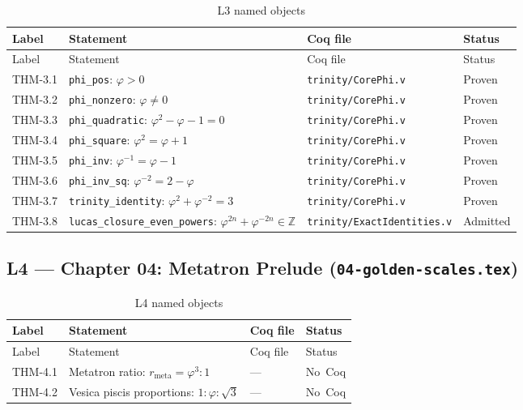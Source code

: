 \begin{longtable}{lp{6cm}ll}
\toprule
Label & Statement & Coq file & Status \\
\midrule
\endfirsthead
\toprule
Label & Statement & Coq file & Status \\
\midrule
\endhead
\bottomrule
\endfoot
\bottomrule
\caption{L3 named objects}
\endlastfoot
THM-3.1 & \texttt{phi\_pos}: $\varphi > 0$ &
  \texttt{trinity/CorePhi.v} & Proven \\
THM-3.2 & \texttt{phi\_nonzero}: $\varphi \neq 0$ &
  \texttt{trinity/CorePhi.v} & Proven \\
THM-3.3 & \texttt{phi\_quadratic}: $\varphi^{2}-\varphi-1=0$ &
  \texttt{trinity/CorePhi.v} & Proven \\
THM-3.4 & \texttt{phi\_square}: $\varphi^{2}=\varphi+1$ &
  \texttt{trinity/CorePhi.v} & Proven \\
THM-3.5 & \texttt{phi\_inv}: $\varphi^{-1}=\varphi-1$ &
  \texttt{trinity/CorePhi.v} & Proven \\
THM-3.6 & \texttt{phi\_inv\_sq}: $\varphi^{-2}=2-\varphi$ &
  \texttt{trinity/CorePhi.v} & Proven \\
THM-3.7 & \texttt{trinity\_identity}: $\varphi^{2}+\varphi^{-2}=3$ &
  \texttt{trinity/CorePhi.v} & Proven \\
THM-3.8 & \texttt{lucas\_closure\_even\_powers}:
  $\varphi^{2n}+\varphi^{-2n}\in\mathbb{Z}$ &
  \texttt{trinity/ExactIdentities.v} & Admitted \\
\end{longtable}

\subsection{L4 — Chapter 04: Metatron Prelude (\texttt{04-golden-scales.tex})}
\label{sec:A-L4}

\begin{longtable}{lp{6cm}ll}
\toprule
Label & Statement & Coq file & Status \\
\midrule
\endfirsthead
\toprule
Label & Statement & Coq file & Status \\
\midrule
\endhead
\bottomrule
\endfoot
\bottomrule
\caption{L4 named objects}
\endlastfoot
THM-4.1 & Metatron ratio: $r_{\text{meta}} = \varphi^{3}:1$ & --- & No~Coq \\
THM-4.2 & Vesica piscis proportions: $1:\varphi:\sqrt{3}$ & --- & No~Coq \\
\end{longtable}

